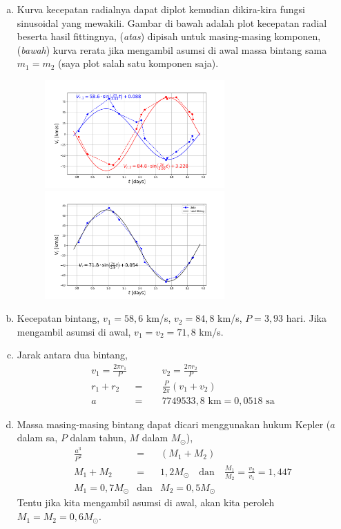 \documentclass[11pt,fleqn]{exam}
\newcommand*{\Msun}{\ensuremath{M_{\odot}}}
\begin{document}
\begin{questions}
\begin{enumerate}[a).]
	\item Kurva kecepatan radialnya dapat diplot kemudian dikira-kira fungsi sinusoidal yang mewakili.
	Gambar di bawah adalah plot kecepatan radial beserta hasil fittingnya, (\textit{atas}) dipisah untuk masing-masing komponen, (\textit{bawah}) kurva rerata jika mengambil asumsi di awal massa bintang sama $m_1 = m_2$ (saya plot salah satu komponen saja). 
	\begin{figure}[!ht]
		\centering
		\includegraphics[width=0.65\textwidth]{vrad.png}
		\includegraphics[width=0.65\textwidth]{vrad_combine.png}
	\end{figure}

	\item Kecepatan bintang, $v_1 = 58,6$ km/s, $v_2 = 84,8$ km/s, $P = 3,93$ hari. Jika mengambil asumsi di awal, $v_1 = v_2 = 71,8$ km/s.
	
	\item Jarak antara dua bintang,
		\begin{eqnarray*}
			v_1 = \frac{2 \pi r_1}{P} &\qquad& v_2 = \frac{2 \pi r_2}{P}  \\
			r_1 + r_2 &=& \frac{P}{2 \pi}(v_1 + v_2)\\
			a &=& 7749533,8 \text{   km}  =  0,0518 \text{  sa}
		\end{eqnarray*}
	
	\item Massa masing-masing bintang dapat dicari menggunakan hukum Kepler ($a$ dalam sa, $P$ dalam tahun, $M$ dalam \Msun),
		\begin{eqnarray*}
			\frac{a^3}{P^2} &=& (M_1 + M_2)\\
			M_1 + M_2 &=& 1,2 M_{\odot} \quad \text{dan} \quad \frac{M_1}{M_2} = \frac{v_2}{v_1} = 1,447 \\
			M_1 = 0,7 M_{\odot} &\text{dan}& M_2 = 0,5 M_{\odot}
		\end{eqnarray*}
	Tentu jika kita mengambil asumsi di awal, akan kita peroleh $M_1 = M_2 = 0,6 M_{\odot}$.
		

\end{enumerate}
\end{questions}
\end{document}
